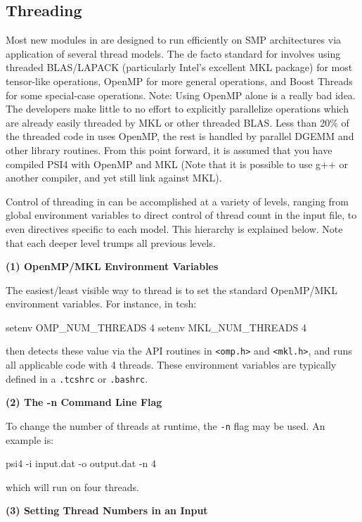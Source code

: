 \subsection{Threading}
\label{sec:threading}

Most new modules in \PSIfour are designed to run efficiently on SMP architectures
via application of several thread models. The de facto standard for \PSIfour 
involves using threaded BLAS/LAPACK (particularly Intel's excellent MKL package)
for most tensor-like operations, OpenMP for more general operations, and Boost
Threads for some special-case operations. Note: Using OpenMP alone is a really
bad idea. The developers make little to no effort to explicitly parallelize
operations which are already easily threaded by MKL or other threaded BLAS. Less
than 20\% of the threaded code in \PSIfour uses OpenMP, the rest is handled by
parallel DGEMM and other library routines. From this point forward, it is
assumed that you have compiled PSI4 with OpenMP and MKL (Note that it is
possible to use g++ or another compiler, and yet still link against MKL).

Control of threading in \PSIfour can be accomplished at a variety of levels,
ranging from global environment variables to direct control of thread count in
the input file, to even directives specific to each model. This hierarchy is
explained below. Note that each deeper level trumps all previous levels. 

\flushleft \textbf{(1) OpenMP/MKL Environment Variables}

The easiest/least visible way to thread \PSIfour is to set the standard OpenMP/MKL
environment variables. For instance, in tcsh:
\begin{Snippet}
setenv OMP_NUM_THREADS 4
setenv MKL_NUM_THREADS 4
\end{Snippet}
\PSIfour then detects these value via the API routines in \texttt{<omp.h>} and
\texttt{<mkl.h>}, and runs all applicable code with 4 threads. These environment
variables are typically defined in a \texttt{.tcshrc} or \texttt{.bashrc}.  

\flushleft \textbf{(2) The -n Command Line Flag}

To change the number of threads at runtime, the \texttt{-n} flag may be used. An
example is:
\begin{Snippet}
psi4 -i input.dat -o output.dat -n 4 
\end{Snippet}
which will run on four threads.

\flushleft \textbf{(3) Setting Thread Numbers in an Input}

